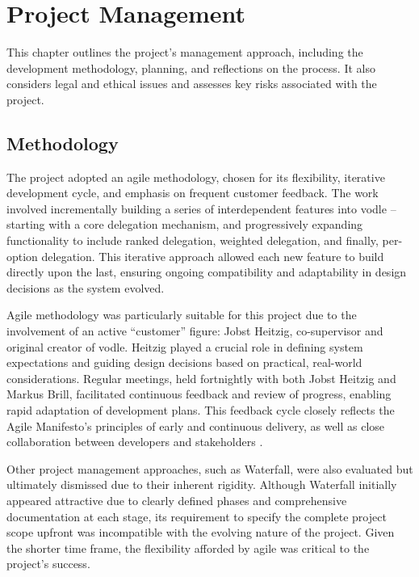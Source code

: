 \chapter{Project Management}\label{ch:project_management}

This chapter outlines the project's management approach, including the development methodology, planning, and reflections on the process. It also considers legal and ethical issues and assesses key risks associated with the project.

\section{Methodology}
The project adopted an agile methodology, chosen for its flexibility, iterative development cycle, and emphasis on frequent customer feedback. The work involved incrementally building a series of interdependent features into vodle -- starting with a core delegation mechanism, and progressively expanding functionality to include ranked delegation, weighted delegation, and finally, per-option delegation. This iterative approach allowed each new feature to build directly upon the last, ensuring ongoing compatibility and adaptability in design decisions as the system evolved.

Agile methodology was particularly suitable for this project due to the involvement of an active ``customer'' figure: Jobst Heitzig, co-supervisor and original creator of vodle. Heitzig played a crucial role in defining system expectations and guiding design decisions based on practical, real-world considerations. Regular meetings, held fortnightly with both Jobst Heitzig and Markus Brill, facilitated continuous feedback and review of progress, enabling rapid adaptation of development plans. This feedback cycle closely reflects the Agile Manifesto's principles of early and continuous delivery, as well as close collaboration between developers and stakeholders \citep{agilemanifesto2001}.

Other project management approaches, such as Waterfall, were also evaluated but ultimately dismissed due to their inherent rigidity. Although Waterfall initially appeared attractive due to clearly defined phases and comprehensive documentation at each stage, its requirement to specify the complete project scope upfront was incompatible with the evolving nature of the project. Given the shorter time frame, the flexibility afforded by agile was critical to the project's success.

